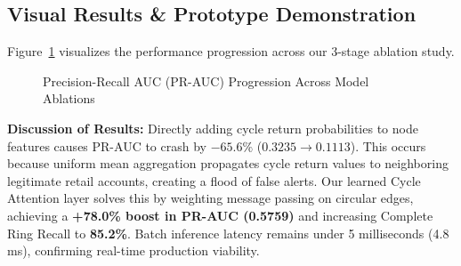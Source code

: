 \documentclass[11pt, a4paper]{article}
\begin{document}
\subsection{Visual Results \& Prototype Demonstration}
\noindent
Figure~\ref{fig:ablation_chart} visualizes the performance progression across our 3-stage ablation study.
\begin{figure}[H]
    \centering
    \caption{Precision-Recall AUC (PR-AUC) Progression Across Model Ablations}
    \label{fig:ablation_chart}
\end{figure}

\noindent
\textbf{Discussion of Results:} Directly adding cycle return probabilities to node features causes PR-AUC to crash by $-65.6\%$ ($0.3235 \to 0.1113$). This occurs because uniform mean aggregation propagates cycle return values to neighboring legitimate retail accounts, creating a flood of false alerts. Our learned Cycle Attention layer solves this by weighting message passing on circular edges, achieving a \textbf{+78.0\% boost in PR-AUC (0.5759)} and increasing Complete Ring Recall to \textbf{85.2\%}. Batch inference latency remains under 5 milliseconds (4.8 ms), confirming real-time production viability.

\end{document}
